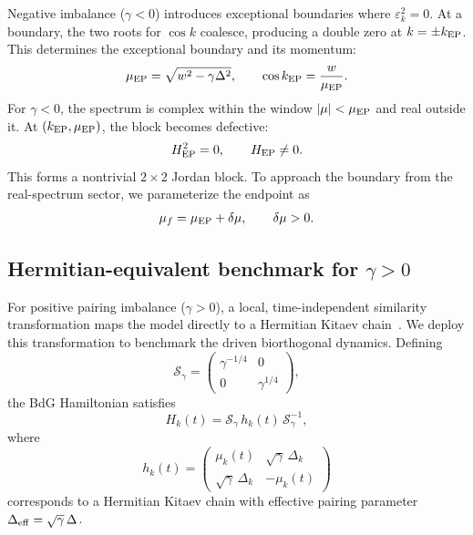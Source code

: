\documentclass[aps,prb,reprint,superscriptaddress,amsmath,amssymb,floatfix]{revtex4-2}
\begin{document}
  Negative imbalance ($\gamma<0$) introduces exceptional boundaries where $\varepsilon_k^2=0$. At a boundary, the two roots for $\cos k$ coalesce, producing a double zero at $k=\pm k_{\rm EP}$. This determines the exceptional boundary and its momentum:
\begin{equation}
\begin{aligned}
\mu_{\rm EP} = \sqrt{w^2-\gamma\Delta^2}, \qquad \cos k_{\rm EP} = \frac{w}{\mu_{\rm EP}}.
\end{aligned} \label{eq:kep}
\end{equation}
For $\gamma<0$, the spectrum is complex within the window $\vert{}\mu\vert{}<\mu_{\rm EP}$ and real outside it. At $(k_{\rm EP},\mu_{\rm EP})$, the block becomes defective:
\begin{equation}
\begin{aligned}
H_{\rm EP}^2=0, \qquad H_{\rm EP}\neq0.
\end{aligned} \label{eq:nilpotent}
\end{equation}
This forms a nontrivial $2\times2$ Jordan block. To approach the boundary from the real-spectrum sector, we parameterize the endpoint as
\begin{equation}
\begin{aligned}
\mu_f=\mu_{\rm EP}+\delta\mu, \qquad \delta\mu>0.
\end{aligned} \label{eq:continuous_endpoint}
\end{equation}

\subsection{Hermitian-equivalent benchmark for $\gamma>0$}

  For positive pairing imbalance ($\gamma>0$), a local, time-independent similarity transformation maps the model directly to a Hermitian Kitaev chain~\cite{Li2018}. We deploy this transformation to benchmark the driven biorthogonal dynamics. Defining
\begin{equation}
\mathcal S_{\gamma} = \begin{pmatrix} \gamma^{-1/4} & 0\\ 0 & \gamma^{1/4} \end{pmatrix},
\label{eq:Sgamma}
\end{equation}
the BdG Hamiltonian satisfies
\begin{equation}
H_k(t) = \mathcal S_{\gamma}\, h_k(t)\, \mathcal S_{\gamma}^{-1},
\label{eq:similarity_H}
\end{equation}
where
\begin{equation}
h_k(t) = \begin{pmatrix} \mu_k(t) & \sqrt{\gamma}\,\Delta_k\\ \sqrt{\gamma}\,\Delta_k & -\mu_k(t) \end{pmatrix}
\label{eq:effective_Hermitian_H}
\end{equation}
corresponds to a Hermitian Kitaev chain with effective pairing parameter $\Delta_{\rm eff}=\sqrt{\gamma}\,\Delta$.
\end{document}
